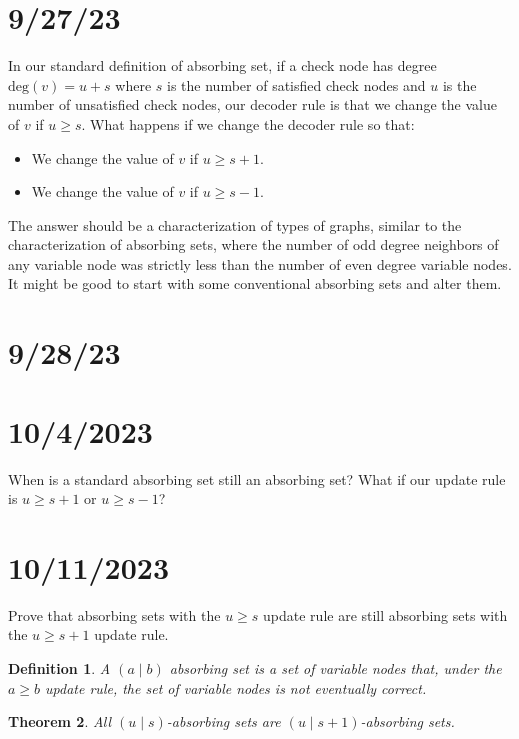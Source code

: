 \documentclass{article}
\newtheorem{thm}{Theorem}[section]
\newtheorem{definition}[thm]{Definition}
\begin{document}
\section*{9/27/23}

In our standard definition of absorbing set, if a check node has degree $\text{deg}(v) = u + s$ where $s$ is the number of satisfied check nodes and $u$ is the number of unsatisfied check nodes, our decoder rule is that we change the value of $v$ if $u \geq s$. What happens if we change the decoder rule so that:
\begin{itemize}
    \item We change the value of $v$ if $u \geq s + 1$.
    \item We change the value of $v$ if $u \geq s - 1$.
\end{itemize}
The answer should be a characterization of types of graphs, similar to the characterization of absorbing sets, where the number of odd degree neighbors of any variable node was strictly less than the number of even degree variable nodes. It might be good to start with some conventional absorbing sets and alter them.

\section{9/28/23}


\section*{10/4/2023}

When is a standard absorbing set still an absorbing set? What if our update rule is $u \geq s + 1$ or $u \geq s - 1$?

\section*{10/11/2023}

Prove that absorbing sets with the $u \geq s$ update rule are still absorbing sets with the $u \geq s + 1$ update rule.

\begin{definition}
    A $(a \mid b)$ absorbing set is a set of variable nodes that, under the $a \geq b$ update rule, the set of variable nodes is not eventually correct.
\end{definition}


\begin{thm}
    All $(u\mid s)$-absorbing sets are $(u\mid s+1)$-absorbing sets.
\end{thm}
\end{document}
